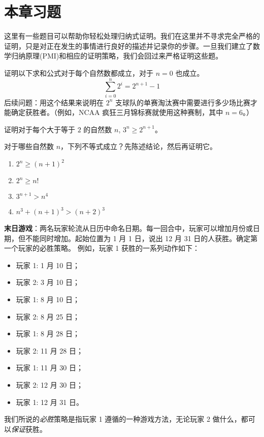 \section{本章习题}

这里有一些题目可以帮助你轻松处理归纳式证明。我们在这里并不寻求完全严格的证明，只是对正在发生的事情进行良好的描述并记录你的步骤。一旦我们建立了数学归纳原理(PMI)和相应的证明策略，我们会回过来严格证明这些题。

\begin{exercise} \label{ex:exercises2.7.1}
    证明以下求和公式对于每个自然数都成立，对于 $n=0$ 也成立。
    \[\sum_{i=0}^{n}2^i=2^{n+1}-1\]
    后续问题：用这个结果来说明在 $2^n$ 支球队的单赛淘汰赛中需要进行多少场比赛才能确定获胜者。（例如，NCAA 疯狂三月锦标赛就使用这种赛制，其中 $n = 6$。）
\end{exercise}

\begin{exercise}
    证明对于每个大于等于 $2$ 的自然数 $n$, $3^n \ge 2^{n+1}$。
\end{exercise}

\begin{exercise}
    对于哪些自然数 $n$，下列不等式成立？先陈述结论，然后再证明它。
    \begin{enumerate}
        \item $2^n \ge (n + 1)^2$
        \item $2^n \ge n!$
        \item $3^{n+1} > n^4$
        \item $n^3 + (n + 1)^3 > (n + 2)^3$
    \end{enumerate}
\end{exercise}

\begin{exercise}
    \textbf{末日游戏}：两名玩家轮流从日历中命名日期。每一回合中，玩家可以增加月份或日期，但不能同时增加。起始位置为 1 月 1 日，说出 12 月 31 日的人获胜。确定第一个玩家的必胜策略。
    例如，玩家 1 获胜的一系列动作如下：
    \begin{itemize}
        \item 玩家 1: 1 月 10 日；
        \item 玩家 2: 3 月 10 日；
        \item 玩家 1: 8 月 10 日；
        \item 玩家 2: 8 月 25 日；
        \item 玩家 1: 8 月 28 日；
        \item 玩家 2: 11 月 28 日；
        \item 玩家 1: 11 月 30 日；
        \item 玩家 2: 12 月 30 日；
        \item 玩家 1: 12 月 31 日。
    \end{itemize}
    我们所说的\emph{必胜}策略是指玩家 1 遵循的一种游戏方法，无论玩家 2 做什么，都可以\emph{保证}获胜。
\end{exercise}

